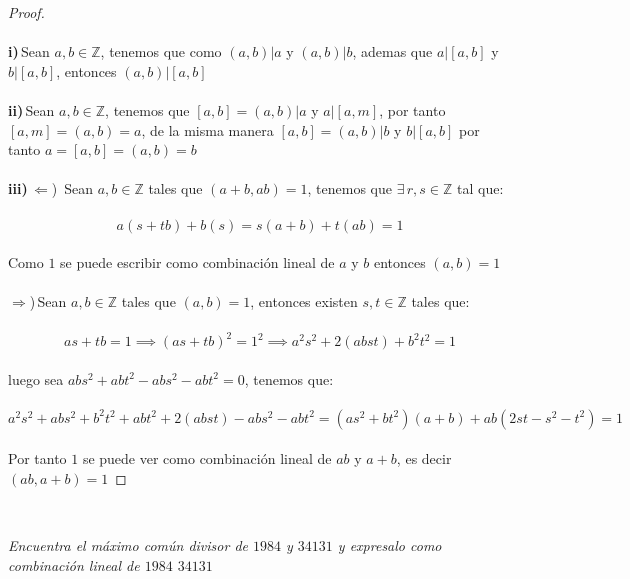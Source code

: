 \documentclass[11pt,letterpaper]{article}
\newcommand{\Z}{\mathbb{Z}}
\begin{document}
\begin{proof}\,\\
    \,\\
    \textbf{i)}\,Sean $a,b\in \Z$, tenemos que como $(a,b)|a$ y $(a,b)|b$, ademas que $a|[a,b]$ y $b|[a,b]$, entonces $(a,b)|[a,b]$\,\\
    \,\\
    \textbf{ii)}\,Sean $a,b\in \Z$, tenemos que $[a,b]=(a,b)|a$ y $a|[a,m]$, por tanto $[a,m]=(a,b)=a$, de la misma manera
    $[a,b]=(a,b)|b$ y $b|[a,b]$ por tanto $a=[a,b]=(a,b)=b$\,\\
    \,\\
    \textbf{iii)}\,$\Leftarrow$)\, Sean $a,b\in \Z$ tales que $(a+b,ab)=1$, tenemos que $\exists\,r,s \in \Z$ tal que:\,\\
    \,\\
    \begin{equation*}
        a(s+tb)+b(s)=s(a+b)+t(ab)=1
    \end{equation*}\,\\
    Como $1$ se puede escribir como combinaci\'on lineal de $a$ y $b$ entonces $(a,b)=1$\,\\
    \,\\
    $\Rightarrow$)\,Sean $a,b\in \Z$ tales que $(a,b)=1$, entonces existen $s,t\in \Z$ tales que:\,\\
    \,\\
    \begin{equation*}
        as+tb=1\implies (as+tb)^2=1^2\implies a^2s^2+2(abst)+b^2t^2=1
    \end{equation*}\,\\
    luego sea $abs^2+abt^2-abs^2-abt^2=0$, tenemos que:\,\\
    \,\\
    \begin{equation*}
        a^2s^2+abs^2+b^2t^2+abt^2+2(abst)-abs^2-abt^2=(as^2+bt^2)(a+b)+ab(2st-s^2-t^2)=1
    \end{equation*}\,\\
    Por tanto $1$ se puede ver como combinaci\'on lineal de $ab$ y $a+b$, es decir $(ab,a+b)=1$
\end{proof}\,\\
\newpage
\begin{tcolorbox}[
	title = \textcolor{black}{\textcolor{white}{Problema 7}},]
\textit{
Encuentra el m\'aximo com\'un divisor de $1984$ y $34131$ y expresalo como combinaci\'on lineal de $1984$ $34131$ 
}
\end{tcolorbox}\,\\
\end{document}
